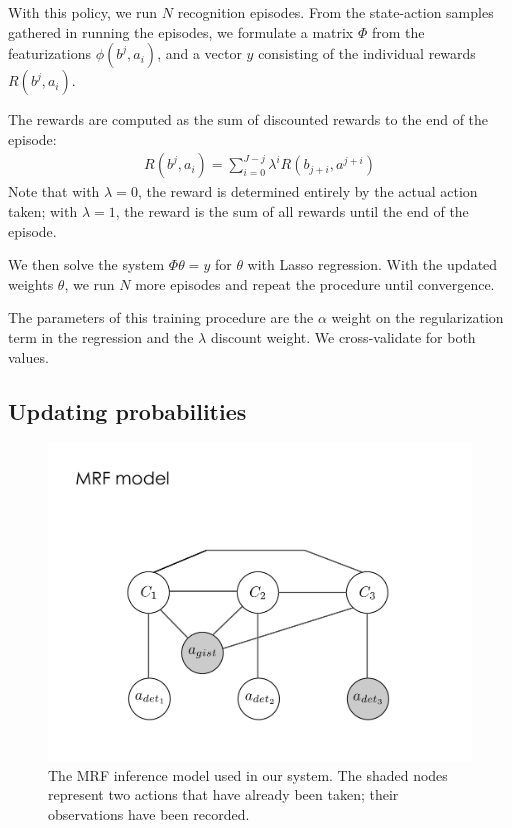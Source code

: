 With this policy, we run $N$ recognition episodes.
From the state-action samples gathered in running the episodes, we formulate a matrix $\Phi$ from the featurizations $\phi(b^j,a_i)$, and a vector $y$ consisting of the individual rewards $R(b^j,a_i)$.

The rewards are computed as the sum of discounted rewards to the end of the episode:
\begin{align}
R(b^j,a_i) = \sum_{i=0}^{J-j} \lambda^i R(b_{j+i},a^{j+i})
\end{align}
Note that with $\lambda=0$, the reward is determined entirely by the actual action taken; with $\lambda=1$, the reward is the sum of all rewards until the end of the episode.

We then solve the system $\Phi \theta = y$ for $\theta$ with Lasso regression.
With the updated weights $\theta$, we run $N$ more episodes and repeat the procedure until convergence.

The parameters of this training procedure are the $\alpha$ weight on the regularization term in the regression and the $\lambda$ discount weight.
We cross-validate for both values.


\subsection{Updating probabilities}
\begin{figure}[h!]
\centering
\includegraphics[width=0.56\linewidth]{../figures/mrf_w_gist.pdf}
\caption{
The MRF inference model used in our system. The shaded nodes represent two actions that have already been taken; their observations have been recorded.
}
\label{fig:model}
\end{figure}



